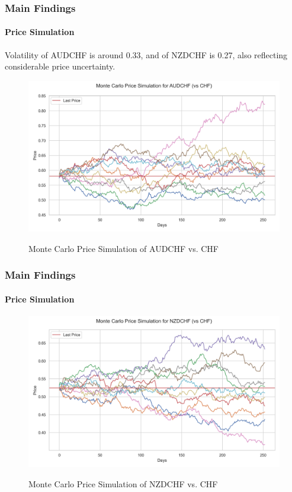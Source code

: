 \documentclass[10pt]{beamer}
\begin{document}
\begin{frame}
\frametitle{Main Findings}
\framesubtitle{Price Simulation}
Volatility of AUDCHF is around 0.33, and of NZDCHF is 0.27, also reflecting considerable price uncertainty.
\begin{figure}[h]
    \centering \includegraphics[width=0.9\linewidth]{../../reports/figures/monte_carlo_price_simulation_AUDCHF_vs_CHF.png}    \label{fig:monte_carlo_price_simulation_AUDCHF_vs_CHF}
    \caption{Monte Carlo Price Simulation of AUDCHF vs. CHF}
\end{figure}
\end{frame}
\begin{frame}
\frametitle{Main Findings}
\framesubtitle{Price Simulation}
\begin{figure}[h]
    \centering  \includegraphics[width=0.9\linewidth]{../../reports/figures/monte_carlo_price_simulation_NZDCHF_vs_CHF.png}  \label{fig:monte_carlo_price_simulation_NZDCHF_vs_CHF}
    \caption{Monte Carlo Price Simulation of NZDCHF vs. CHF}
\end{figure}
\end{frame}
\end{document}
